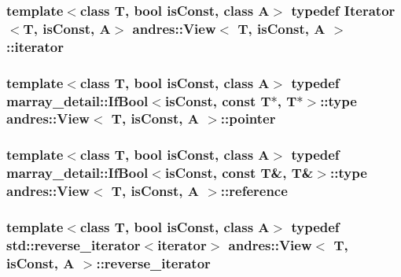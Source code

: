 \subsubsection[{iterator}]{\setlength{\rightskip}{0pt plus 5cm}template$<$class T, bool is\+Const, class A$>$ typedef {\bf Iterator}$<$T, is\+Const, A$>$ {\bf andres\+::\+View}$<$ T, is\+Const, A $>$\+::{\bf iterator}}\label{classandres_1_1View_aef54ee0a58e755b897398493d05a44df}
\hypertarget{classandres_1_1View_a9a201594c82be89fccd0fe644ea2f09c}{}
\subsubsection[{pointer}]{\setlength{\rightskip}{0pt plus 5cm}template$<$class T, bool is\+Const, class A$>$ typedef marray\+\_\+detail\+::\+If\+Bool$<$is\+Const, const T$\ast$, T$\ast$$>$\+::type {\bf andres\+::\+View}$<$ T, is\+Const, A $>$\+::{\bf pointer}}\label{classandres_1_1View_a9a201594c82be89fccd0fe644ea2f09c}
\hypertarget{classandres_1_1View_aebdd1f19272b743b4422ff8ba18fc11a}{}
\subsubsection[{reference}]{\setlength{\rightskip}{0pt plus 5cm}template$<$class T, bool is\+Const, class A$>$ typedef marray\+\_\+detail\+::\+If\+Bool$<$is\+Const, const T\&, T\&$>$\+::type {\bf andres\+::\+View}$<$ T, is\+Const, A $>$\+::{\bf reference}}\label{classandres_1_1View_aebdd1f19272b743b4422ff8ba18fc11a}
\hypertarget{classandres_1_1View_aab07af42756759420211d114bb705547}{}
\subsubsection[{reverse\+\_\+iterator}]{\setlength{\rightskip}{0pt plus 5cm}template$<$class T, bool is\+Const, class A$>$ typedef std\+::reverse\+\_\+iterator$<${\bf iterator}$>$ {\bf andres\+::\+View}$<$ T, is\+Const, A $>$\+::{\bf reverse\+\_\+iterator}}\label{classandres_1_1View_aab07af42756759420211d114bb705547}
\hypertarget{classandres_1_1View_aa80ab78f6e3a32ead389d657f6ec7308}{}
